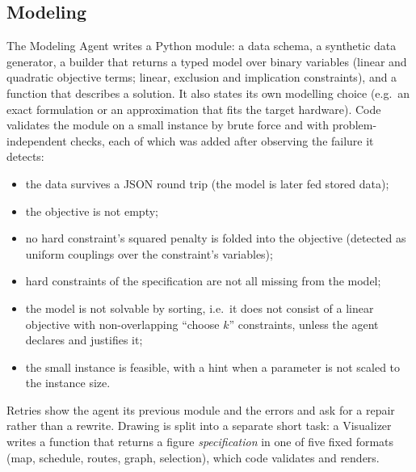 \subsection{Modeling}
The Modeling Agent writes a Python module: a data schema, a synthetic data generator, a builder that returns a
typed model over binary variables (linear and quadratic objective terms; linear, exclusion and implication
constraints), and a function that describes a solution. It also states its own modelling choice (e.g.\ an exact
formulation or an approximation that fits the target hardware). Code validates the module on a small instance by
brute force and with problem-independent checks, each of which was added after observing the failure it detects:
\begin{itemize}
  \item the data survives a JSON round trip (the model is later fed stored data);
  \item the objective is not empty;
  \item no hard constraint's squared penalty is folded into the objective (detected as uniform couplings over the
        constraint's variables);
  \item hard constraints of the specification are not all missing from the model;
  \item the model is not solvable by sorting, i.e.\ it does not consist of a linear objective with
        non-overlapping ``choose $k$'' constraints, unless the agent declares and justifies it;
  \item the small instance is feasible, with a hint when a parameter is not scaled to the instance size.
\end{itemize}
Retries show the agent its previous module and the errors and ask for a repair rather than a rewrite. Drawing is
split into a separate short task: a Visualizer writes a function that returns a figure \emph{specification} in one
of five fixed formats (map, schedule, routes, graph, selection), which code validates and renders.

